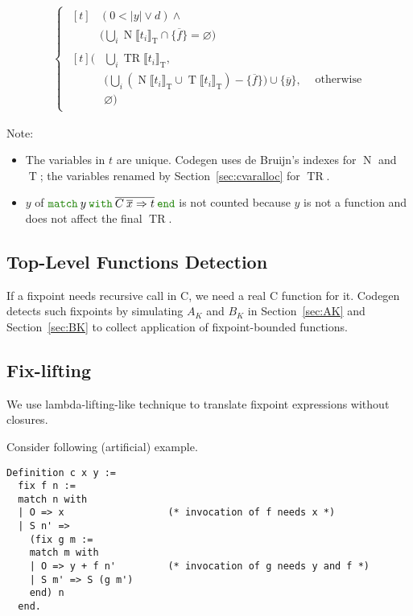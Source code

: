 \documentclass[a4paper,fleqn]{article}
\def\codegen{\textrm{Codegen}}
\newcommand{\kwmatch}{\mbox{\color{mygreen}\ttfamily match}}
\newcommand{\kwwith}{\mbox{\color{mygreen}\ttfamily with}}
\newcommand{\kwend}{\mbox{\color{mygreen}\ttfamily end}}
\newcommand{\omatch}[2]{\kwmatch\:#1\:\kwwith\:{#2}\:\kwend}
\newcommand{\tbigcup}{{\textstyle\bigcup}}
\newcommand{\BRA}[1]{\llbracket #1 \rrbracket}
\DeclareMathOperator{\TRop}{TR}
\newcommand{\TR}[2]{\TRop\BRA{#1}_{#2}}
\DeclareMathOperator{\Nop}{N}
\DeclareMathOperator{\Top}{T}
\newcommand{\N}[2]{\Nop\BRA{#1}_{#2}}
\newcommand{\T}[2]{\Top\BRA{#1}_{#2}}
\newcommand{\true}{\mathrm{T}}
\newcommand{\secref}[1]{Section~\ref{#1}}
\newcommand{\rep}[1]{\overline{#1}}
\begin{document}
\begin{align*}
\begin{cases}
\begin{aligned}[t]
          & (0 < |y| \vee d) \wedge \\
          & \bigl(\tbigcup_i \N{t_i}{\true} \cap \{\rep{f}\} = \varnothing\bigr)
          \end{aligned} \\
      \begin{aligned}[t]
        \bigl(& \tbigcup_i \TR{t_i}{\true}, \\
              & \bigl(\tbigcup_i (\N{t_i}{\true} \cup \T{t_i}{\true}) - \{\rep{f}\}\bigr) \cup \{\rep{y}\}, \\
              & \varnothing \bigr)
      \end{aligned}
        & \text{otherwise}
    \end{cases}
\end{align*}
{\small Note:
\begin{itemize}
  \item The variables in $t$ are unique.
    \codegen{} uses de Bruijn's indexes for $\Nop$ and $\Top$;
    the variables renamed by \secref{sec:cvaralloc} for $\TRop$.
  \item $y$ of $\omatch{y}{\rep{C\:\rep{x}\Rightarrow t}}$ is not counted because $y$ is not a function and does not affect the final $\TRop$.
\end{itemize}}

\subsection{Top-Level Functions Detection}\label{sec:top-level-function-detection}
If a fixpoint needs recursive call in C, we need a real C function for it.
\codegen{} detects such fixpoints by simulating $A_K$ and $B_K$ in \secref{sec:AK} and \secref{sec:BK} to collect application of fixpoint-bounded functions.

\subsection{Fix-lifting}\label{sec:fix-lifting}

We use lambda-lifting-like technique to translate fixpoint expressions without closures.

Consider following (artificial) example.

\begin{lstlisting}
Definition c x y :=
  fix f n :=
  match n with
  | O => x                  (* invocation of f needs x *)
  | S n' =>
    (fix g m :=
    match m with
    | O => y + f n'         (* invocation of g needs y and f *)
    | S m' => S (g m')
    end) n
  end.
\end{lstlisting}
\end{document}
